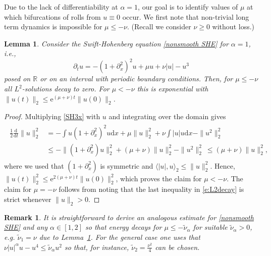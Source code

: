 \documentclass{article}
\numberwithin{equation}{section}
\newtheorem{lemma}[theorem]{Lemma}
\newtheorem{remark}[theorem]{Remark}
\def\R{\mathbb{R}}
\def\rmd{\mathrm{d}}
\def\rme{\mathrm{e}}
\begin{document}
Due to the lack of differentiability at $\alpha=1$, 
our goal is to identify values of $\mu$ at which bifurcations of rolls from $u\equiv 0$ occur. We first note that non-trivial long term dynamics is impossible for $\mu\leq -\nu$. (Recall we consider $\nu\geq 0$ without loss.)

\begin{lemma}\label{lem:globaldecay}
Consider the Swift-Hohenberg equation \eqref{nonsmooth SHE} for $\alpha=1$, i.e., 
\begin{equation} \label{SH3x}
\partial_t u = - (1+\partial_x^2)^2 u + \mu u + \nu |u| -u^3
\end{equation}
posed on $\R$ or on an interval with periodic boundary conditions. 
Then, for $\mu\leq -\nu$ all $L^2$-solutions decay to zero. For $\mu< -\nu$ this is exponential with $\|u(t)\|_2 \leq \rme^{(\mu+\nu)t}\|u(0)\|_2$.  
\end{lemma}

\begin{proof}
	Multiplying \eqref{SH3x} with $u$ and integrating over the domain gives 
	\begin{align}\label{e:L2decay}
		\begin{split}
			\frac{1}{2}\frac{\rmd}{\rmd t}\|u\|_2^2 &= -\int u (1+\partial_x^2)^2 u \rmd x + \mu \|u\|_2^2 + \nu \int |u|u\rmd x - \|u^2\|_2^2 \\
			& \leq -\|(1+\partial^2_x)u\|_2^2 + (\mu+\nu) \|u\|_2^2 - \|u^2\|_2^2 \ \leq (\mu+\nu) \|u\|_2^2,	
		\end{split}
	\end{align}
	where we used that $(1+\partial_x^2)$ is symmetric and $\langle |u|,u \rangle_2 \leq \|u\|_2^2$. 
	Hence, $\|u(t)\|_2^2 \leq \rme^{2(\mu+\nu)t}\|u(0)\|_2^2$, which proves the claim for $\mu<-\nu$. The claim for $\mu=-\nu$ follows from noting that the last inequality in \eqref{e:L2decay} is strict whenever $\|u\|_2>0$. 
\end{proof}

\begin{remark}
It is straightforward to derive an analogous estimate for \eqref{nonsmooth SHE} and any $\alpha\in[1,2]$ so that energy decays for $\mu\leq -\tilde\nu_\alpha$ for suitable $\tilde\nu_\alpha>0$, e.g. $\tilde\nu_1=\nu$ due to Lemma~\ref{lem:globaldecay}. For the general case one uses that $\nu |u|^\alpha u - u^4\leq \tilde\nu_\alpha u^2$ so that, for instance, $\tilde\nu_2=\tfrac{\nu^2}{4}$ can be chosen. 
\end{remark}
\end{document}
